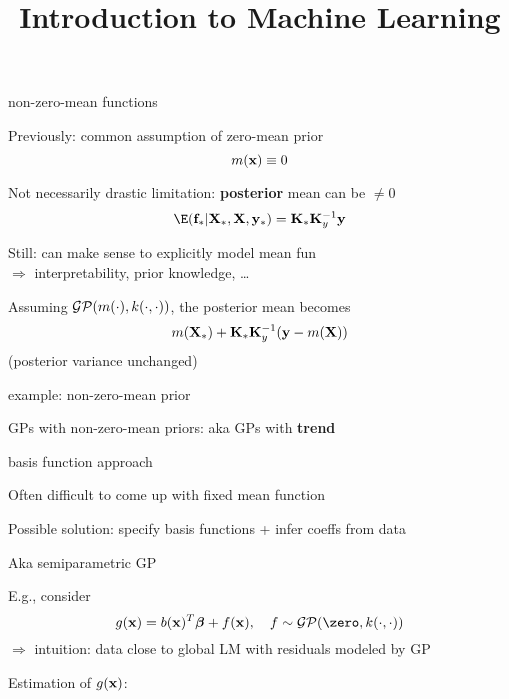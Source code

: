 \documentclass[11pt,compress,t,notes=noshow, xcolor=table]{beamer}
\title{Introduction to Machine Learning}
\begin{document}


\begin{framei}[sep=L]{non-zero-mean functions}
\item Previously: common assumption of zero-mean prior $$m(\mathbf{x}) \equiv 0$$
\item Not necessarily drastic limitation: \textbf{posterior} mean can be $\neq 0$
$$\E(\fs | \Xs, \Xmat, \ys) = \Ks \Ky^{-1} \yv$$
\item Still: can make sense to explicitly model mean fun \\$\Rightarrow$ interpretability, prior knowledge, \dots
\item Assuming $\mathcal{GP}(m(\cdot), k(\cdot, \cdot))$, the posterior mean becomes
$$m(\mathbf{X}_\ast) + \mathbf{K}_{\ast} \mathbf{K}_y^{-1} (\mathbf{y} - m(\mathbf{X}))$$
(posterior variance unchanged)
\end{framei}

\begin{framei}[sep=L]{example: non-zero-mean prior}
\item GPs with non-zero-mean priors: aka GPs with \textbf{trend}
\vfill
{}
\vfill
{}
\end{framei}

\begin{framei}[sep=L]{basis function approach}
\item Often difficult to come up with fixed mean function
\item Possible solution: specify basis functions + infer coeffs from data
\item Aka semiparametric GP
\item E.g., consider $$g(\xv) = b(\xv)^T\bm{\beta} + \fx, \quad f  \sim \GPzk$$
$\Rightarrow$ intuition: data close to global LM with residuals modeled by GP
\item Estimation of $g(\mathbf{x})$: 
\end{framei}

\endlecture
\end{document}
